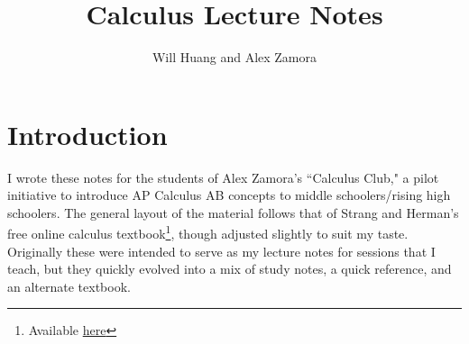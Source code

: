 \documentclass[12pt]{article}
\begin{document}
\title{Calculus Lecture Notes}
\author{Will Huang and Alex Zamora}
\maketitle
\tableofcontents

\newpage 

\section{Introduction}
I wrote these notes for the students of Alex Zamora's ``Calculus Club," a pilot initiative to introduce AP Calculus AB concepts to middle schoolers/rising high schoolers. The general layout of the material follows that of Strang and Herman's free online calculus textbook\footnote{Available \href{https://openstax.org/details/books/calculus-volume-1}{here}}, though adjusted slightly to suit my taste. Originally these were intended to serve as my lecture notes for sessions that I teach, but they quickly evolved into a mix of study notes, a quick reference, and an alternate textbook. 



\end{document}
